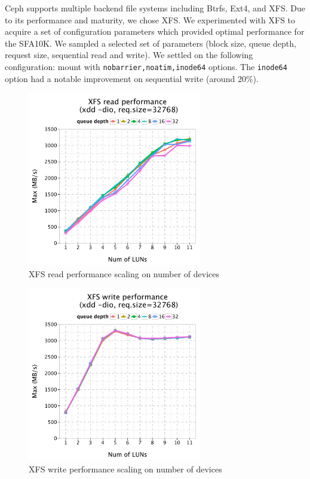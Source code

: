 \documentclass{article}
\begin{document}
Ceph supports multiple backend file systems including Btrfs, Ext4, and XFS.
Due to its performance and maturity, we chose XFS. We experimented with XFS to
acquire a set of configuration parameters which provided optimal performance for
the SFA10K. We sampled a selected set of parameters (block size, queue depth,
request size, sequential read and write). We settled on the following
configuration: mount with \verb!nobarrier,noatim,inode64! options.
The \verb!inode64! option had a notable improvement on sequential write (around
20\%).

\begin{figure}[htb]
\centering
\centering
\includegraphics[width=3in]{data/xdd-read}
\caption{XFS read performance scaling on number of devices}
\label{fig:xfs-read}
\end{figure}

\begin{figure}[htb]
\centering
\includegraphics[width=3in]{data/xdd-write}
\caption{XFS write performance scaling on number of devices}
\label{fig:xfs-write}
\end{figure}
\end{document}
